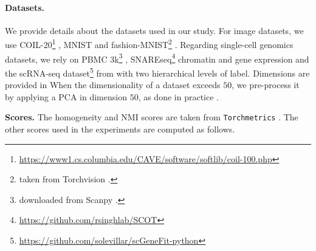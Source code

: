 \paragraph{Datasets.}
We provide details about the datasets used in our study. 
For image datasets, we use COIL-20\footnote{\url{https://www1.cs.columbia.edu/CAVE/software/softlib/coil-100.php}} \citep{nene1996columbia}, MNIST and fashion-MNIST\footnote{taken from Torchvision \citep{marcel2010torchvision}.} \citep{xiao2017fashion}. Regarding single-cell genomics datasets, we rely on PBMC 3k\footnote{downloaded from Scanpy \citep{wolf2018scanpy}.} \citep{wolf2018scanpy}, SNAREseq\footnote{\url{https://github.com/rsinghlab/SCOT}} chromatin and gene expression \citep{chen2019high} and the scRNA-seq dataset\footnote{\url{https://github.com/solevillar/scGeneFit-python}} from \citep{zeisel2015cell} with two hierarchical levels of label. 
Dimensions are provided in 
When the dimensionality of a dataset exceeds $50$, we pre-process it by applying a PCA in dimension $50$, as done in practice \citep{van2008visualizing}.

\begin{table}[h!] \vspace{-5mm}
\centering
\caption{Dataset Sizes.}\label{tab:dataset_details}
\end{table}

\textbf{Scores.} The homogeneity and NMI scores are taken from \texttt{Torchmetrics} \citep{detlefsen2022torchmetrics}. The other scores used in the experiments are computed as follows.

